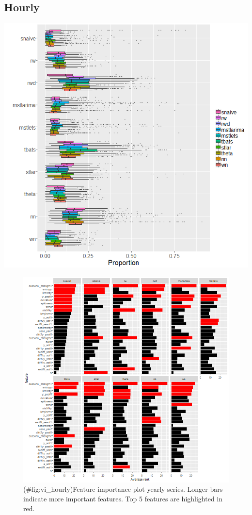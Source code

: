 \documentclass[11pt,a4paper,]{article}
\theoremstyle{definition}
\theoremstyle{definition}
\theoremstyle{definition}
\theoremstyle{remark}
\begin{document}
\newpage

\subsection{Hourly}\label{hourly}

\includegraphics{figures/hourly_oob-1.png}

\newpage

\begin{figure}
\centering
\includegraphics{figures/vi_hourly-1.png}
\caption{(\#fig:vi\_hourly)Feature importance plot yearly series. Longer
bars indicate more important features. Top 5 features are highlighted in
red.}
\end{figure}
\end{document}
